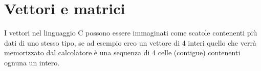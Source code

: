 \chapter{Vettori e matrici}

I vettori nel linguaggio C possono essere immaginati come scatole contenenti più dati di uno stesso tipo, se ad esempio creo un vettore di 4 interi quello che verrà memorizzato dal calcolatore è una sequenza di 4 celle (contigue) contenenti ognuna un intero.